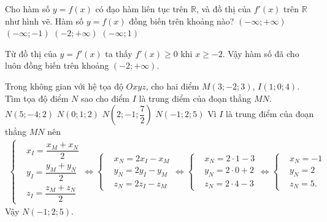 \begin{ex}%
 \immini
 {Cho hàm số $y=f(x)$ có đạo hàm liên tục trên $\mathbb{R}$, và đồ thị của $f'(x)$ trên $\mathbb{R}$ như hình vẽ. Hàm số $y=f(x)$ đồng biến trên khoảng nào?
 \choice
  {$(-\infty;+\infty)$}
  {$(-\infty;-1)$}
  {\True $(-2;+\infty)$}
  {$(-\infty;1)$}
 }
 {
 }
 \loigiai
  {
  Từ đồ thị của $y=f'(x)$ ta thấy $f'(x)\geq 0$ khi $x\geq -2$. Vậy hàm số đã cho luôn đồng biến trên khoảng $(-2;+\infty)$.
  }
\end{ex}

\begin{ex}%
 Trong không gian với hệ tọa độ $Oxyz$, cho hai điểm $M(3;-2;3)$, $I(1;0;4)$. Tìm tọa độ điểm $N$ sao cho điểm $I$ là trung điểm của đoạn thẳng $MN$.
 \choice
  {$N(5;-4;2)$}
  {$N(0;1;2)$}
  {$N\left(2;-1;\dfrac{7}{2}\right)$}
  {\True $N(-1;2;5)$}
 \loigiai
  {
  Vì $I$ là trung điểm của đoạn thẳng $MN$ nên
  \begin{eqnarray*}
   \left\{\begin{aligned}&x_I=\dfrac{x_M+x_N}{2} \\&y_I=\dfrac{y_M+y_N}{2} \\&z_I=\dfrac{z_M+z_N}{2}\end{aligned}\right. \Leftrightarrow \left\{\begin{aligned}&x_N=2x_I-x_M \\&y_N=2y_I-y_M \\&z_N=2z_I-z_M\end{aligned}\right. \Leftrightarrow \left\{\begin{aligned}&x_N=2\cdot 1-3 \\&y_N=2\cdot 0+2 \\&z_N=2\cdot 4-3\end{aligned}\right. \Leftrightarrow \left\{\begin{aligned}&x_N=-1 \\&y_N=2 \\&z_N=5.\end{aligned}\right.
  \end{eqnarray*}
  Vậy $N(-1;2;5)$.
  }
\end{ex}


